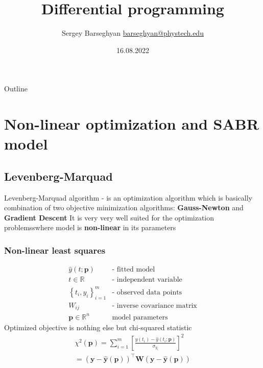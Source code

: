 \documentclass[]{beamer}
\title{Differential programming}
\author{Sergey Barseghyan
\href{mailto:barseghyan@phystech.edu}{barseghyan@phystech.edu}}
\date{16.08.2022}
\begin{document}
\begin{frame}
    \maketitle
\end{frame}

\begin{frame}{Outline}
    \tableofcontents
\end{frame}


\section{Non-linear optimization and SABR model}
\subsection{Levenberg-Marquad}
\begin{frame}
    Levenberg-Marquad algorithm - is an optimization algorithm which is basically combination 
    of two objective minimization algorithms: \textbf{Gauss-Newton} and
    \textbf{Gradient Descent} 
    It is very very well suited for the optimization problemsswhere model is \textbf{non-linear} in its parameters 
\end{frame}

\begin{frame}
\frametitle{Non-linear least squares}

    \begin{eqnarray*}
        \hat{y}(t ; \boldsymbol{p}) & \text{- fitted model} \\
        t \in \mathbb{R} & \text{- independent variable} \\
        \left\{t_{i}, y_{i}\right\}^{m}_{i=1} & \text{- observed data points} \\
        W_{ij} & \text{- inverse covariance matrix} \\
        \boldsymbol{p} \in \mathbb{R}^n  & \text{model parameters}
    \end{eqnarray*}
    Optimized objective is nothing else but chi-squared statistic
    \begin{eqnarray*}
        \chi^{2}(\boldsymbol{p})
         =\sum_{i=1}^{m}
         \left[
            \frac{y\left(t_{i}\right)-\hat{y}\left(t_{i} ; \boldsymbol{p}\right)}
                 {\sigma_{y_{i}}}
         \right]^{2} \\
        =(\boldsymbol{y}-\boldsymbol{\hat{y}}(\boldsymbol{p}))^{\top}
         \boldsymbol{W}
         (\boldsymbol{y}-\hat{\boldsymbol{y}}(\boldsymbol{p}))
    \end{eqnarray*}
    
\end{frame}
\end{document}
